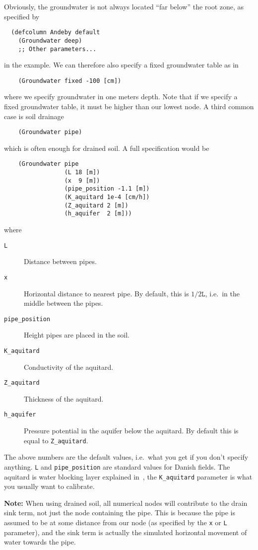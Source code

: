 \documentclass[a4paper,11pt]{article}
\begin{document}
Obviously, the groundwater is not always located ``far below'' the
root zone, as specified by
\begin{verbatim}
  (defcolumn Andeby default
    (Groundwater deep)
    ;; Other parameters...
\end{verbatim}
in the example.  We can therefore also specify a fixed groundwater
table as in
\begin{verbatim}
    (Groundwater fixed -100 [cm])
\end{verbatim}
where we specify groundwater in one meters depth.  Note that if we
specify a fixed groundwater table, it must be higher than our lowest
node.  A third common case is soil drainage
\begin{verbatim}
    (Groundwater pipe)
\end{verbatim}
which is often enough for drained soil.  A full specification would be
\begin{verbatim}
    (Groundwater pipe
                 (L 18 [m])
                 (x  9 [m])
                 (pipe_position -1.1 [m])
                 (K_aquitard 1e-4 [cm/h])
                 (Z_aquitard 2 [m])
                 (h_aquifer  2 [m]))
\end{verbatim}
where
\begin{description}
\item[\texttt{L}] Distance between pipes.
\item[\texttt{x}] Horizontal distance to nearest pipe. By default,
  this is $1/2 \mathtt{L}$, i.e.\ in the middle between the pipes.
\item[\texttt{pipe\_position}] Height pipes are placed in the soil.
\item[\texttt{K\_aquitard}] Conductivity of the aquitard.
\item[\texttt{Z\_aquitard}] Thickness of the aquitard.
\item[\texttt{h\_aquifer}] Pressure potential in the aquifer below the
  aquitard. By default this is equal to \texttt{Z\_aquitard}.
\end{description}
The above numbers are the default values, i.e.\ what you get if you
don't specify anything.  \texttt{L} and \texttt{pipe\_position} are
standard values for Danish fields.  The aquitard is water blocking
layer explained in~\cite{daisy-new}, the \texttt{K\_aquitard}
parameter is what you usually want to calibrate.

\textbf{Note:} When using drained soil, all numerical nodes will
contribute to the drain sink term, not just the node containing the
pipe.  This is because the pipe is assumed to be at some distance from
our node (as specified by the \texttt{x} or \texttt{L} parameter), and
the sink term is actually the simulated horizontal movement of water
towards the pipe.
\end{document}
